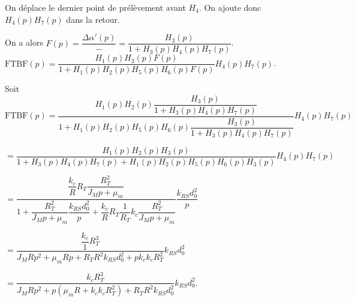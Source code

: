 \ifprof
\begin{corrige}
On déplace le dernier point de prélèvement avant $H_4$. On ajoute donc $H_4(p)H_7(p)$ dans la retour. 

On a alors $F(p)=\dfrac{\Delta \alpha'(p)}{-} = \dfrac{H_3(p)}{1+H_3(p)H_4(p)H_7(p)}$.
$\text{FTBF}(p)  = \dfrac{H_1(p)H_2(p) F(p)}{1+H_1(p)H_2(p)H_5(p)H_6(p) F(p)}H_4(p)H_7(p) $.

Soit 
$\text{FTBF}(p)  = \dfrac{H_1(p)H_2(p) \dfrac{H_3(p)}{1+H_3(p)H_4(p)H_7(p)}}{1+H_1(p)H_2(p)H_5(p)H_6(p) \dfrac{H_3(p)}{1+H_3(p)H_4(p)H_7(p)}}H_4(p)H_7(p) $

$= \dfrac{H_1(p)H_2(p) H_3(p)}{1+H_3(p)H_4(p)H_7(p)+H_1(p)H_2(p)H_5(p)H_6(p) H_3(p)}H_4(p)H_7(p) $

$= \dfrac{\dfrac{k_c}{R}R_T \dfrac{R_T^2}{J_M p  + \mu_m }}{1+\dfrac{R_T^2}{J_M p  + \mu_m }\dfrac{k_{RS}d_0^2}{p}+\dfrac{k_c}{R}R_T \dfrac{1}{R_T}k_c \dfrac{R_T^2}{J_M p  + \mu_m }}\dfrac{k_{RS}d_0^2}{p} $

$= \dfrac{\dfrac{k_c}{1} R_T^3}{J_MR p^2  + \mu_m R p+R_TR^2k_{RS}d_0^2+pk_ck_c R_T^2}k_{RS}d_0^2 $

$= \dfrac{k_c R_T^3}{J_MR p^2  + p\left(\mu_m R  +k_ck_c R_T^2\right)+R_TR^2k_{RS}d_0^2}k_{RS}d_0^2 $.
\end{corrige}
\else
\fi


